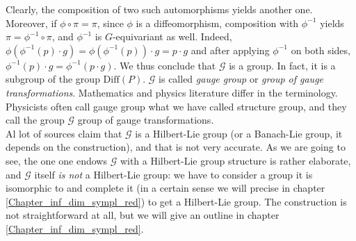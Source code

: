 Clearly, the composition of two such automorphisms yields another one. Moreover, if \(\phi \circ \pi =\pi\), since \(\phi\) is a diffeomorphism, composition with \(\phi^{-1}\) yields \(\pi = \phi^{-1} \circ \pi\), and \(\phi^{-1}\) is \(G\)-equivariant as well. Indeed, \(\phi(\phi^{-1}(p) \cdot g)=\phi(\phi^{-1}(p)) \cdot g = p \cdot g\) and after applying \(\phi^{-1}\) on both sides, \(\phi^{-1}(p) \cdot g=\phi^{-1}(p \cdot g)\). We thus conclude that \(\mathcal{G}\) is a group. In fact, it is a subgroup of the group \(\mathrm{Diff}(P)\). \(\mathcal{G}\) is called \textit{gauge group} or \textit{group of gauge transformations}. Mathematics and physics literature differ in the terminology. Physicists often call gauge group what we have called structure group, and they call  the group \(\mathcal{G}\) group of gauge transformations. \\

Al lot of sources claim that \(\mathcal{G}\) is a Hilbert-Lie group (or a Banach-Lie group, it depends on the construction), and that is not very accurate. As we are going to see, the one one endows \(\mathcal{G}\) with a Hilbert-Lie group structure is rather elaborate, and \(\mathcal{G}\) itself \textit{is not} a Hilbert-Lie group: we have to consider a group it is isomorphic to and complete it (in a certain sense we will precise in chapter \ref{Chapter_inf_dim_sympl_red}) to get a Hilbert-Lie group. The construction is not straightforward at all, but we will give an outline in chapter \ref{Chapter_inf_dim_sympl_red}. \\

